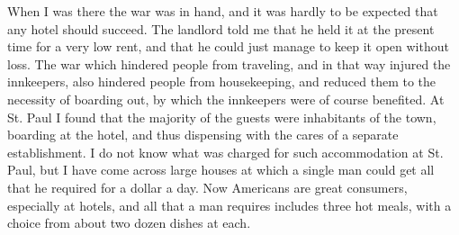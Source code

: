 When I was there the war was in hand, and it was hardly to be
expected that any hotel should succeed.  The landlord told me that
he held it at the present time for a very low rent, and that he
could just manage to keep it open without loss.  The war which
hindered people from traveling, and in that way injured the
innkeepers, also hindered people from housekeeping, and reduced
them to the necessity of boarding out, by which the innkeepers were
of course benefited.  At St. Paul I found that the majority of the
guests were inhabitants of the town, boarding at the hotel, and
thus dispensing with the cares of a separate establishment.  I do
not know what was charged for such accommodation at St. Paul, but I
have come across large houses at which a single man could get all
that he required for a dollar a day.  Now Americans are great
consumers, especially at hotels, and all that a man requires
includes three hot meals, with a choice from about two dozen dishes
at each.

